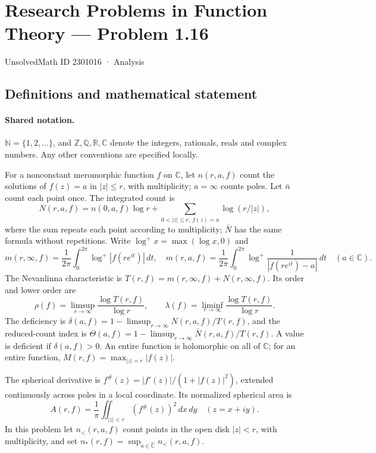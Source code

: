 \documentclass[11pt]{article}
\begin{document}
\setcounter{section}{2301015}
\section{Research Problems in Function Theory — Problem 1.16}\label{2301016}
{\small\sffamily UnsolvedMath ID 2301016 · Analysis}
\subsection{Definitions and mathematical statement}

\paragraph{Shared notation.}$\mathbb N=\{1,2,\ldots\}$, and $\mathbb Z,\mathbb Q,\mathbb R,\mathbb C$ denote the integers, rationals, reals and complex numbers. Any other conventions are specified locally.


For a nonconstant meromorphic function $f$ on $\mathbb C$, let $n(r,a,f)$ count the solutions of $f(z)=a$ in $|z|\le r$, with multiplicity; $a=\infty$ counts poles. Let $\bar n$ count each point once. The integrated count is
\[
 N(r,a,f)=n(0,a,f)\log r+\sum_{0<|z|\le r,\ f(z)=a}\log(r/|z|),
\]
where the sum repeats each point according to multiplicity; $\bar N$ has the same formula without repetitions. Write $\log^+x=\max(\log x,0)$ and
\[
 m(r,\infty,f)=\frac1{2\pi}\int_0^{2\pi}\log^+|f(re^{it})|\,dt,\quad
 m(r,a,f)=\frac1{2\pi}\int_0^{2\pi}\log^+\frac1{|f(re^{it})-a|}\,dt\quad(a\in\mathbb C).
\]
The Nevanlinna characteristic is $T(r,f)=m(r,\infty,f)+N(r,\infty,f)$. Its order and lower order are
\[
 \rho(f)=\limsup_{r\to\infty}\frac{\log T(r,f)}{\log r},\qquad
 \lambda(f)=\liminf_{r\to\infty}\frac{\log T(r,f)}{\log r}.
\]
The deficiency is $\delta(a,f)=1-\limsup_{r\to\infty}N(r,a,f)/T(r,f)$, and the reduced-count index is $\Theta(a,f)=1-\limsup_{r\to\infty}\bar N(r,a,f)/T(r,f)$. A value is deficient if $\delta(a,f)>0$. An entire function is holomorphic on all of $\mathbb C$; for an entire function, $M(r,f)=\max_{|z|=r}|f(z)|$.

The spherical derivative is $f^\#(z)=|f'(z)|/(1+|f(z)|^2)$, extended continuously across poles in a local coordinate. Its normalized spherical area is
\[
 A(r,f)=\frac1\pi\iint_{|z|<r}(f^\#(z))^2\,dx\,dy\quad(z=x+iy).
\] In this problem let $n_{<}(r,a,f)$ count points in the open disk $|z|<r$, with multiplicity, and set $n_*(r,f)=\sup_{a\in\widehat{\mathbb C}}n_{<}(r,a,f)$.
\end{document}

